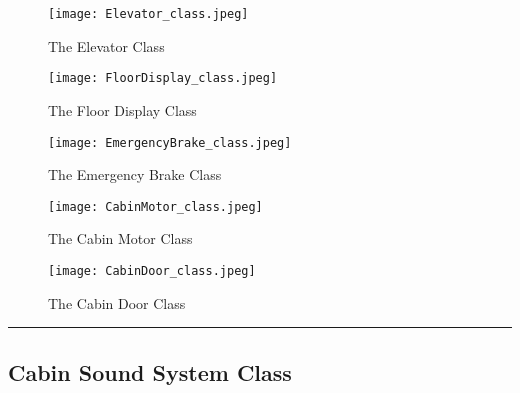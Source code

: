 \documentclass[12pt]{article}
\begin{document}
    \begin{figure}[H]
  		\centerline{\texttt{[image: Elevator\_class.jpeg]}}
  		\caption{The Elevator Class}
  		\label{fig:Elevator_class}
	\end{figure}
    \begin{figure}[H]
  		\centerline{\texttt{[image: FloorDisplay\_class.jpeg]}}
  		\caption{The Floor Display Class}
  		\label{fig:FloorDisplay_class}
	\end{figure}
    \begin{figure}[H]
  		\centerline{\texttt{[image: EmergencyBrake\_class.jpeg]}}
  		\caption{The Emergency Brake Class}
  		\label{fig:EmergencyBrake_class}
	\end{figure}
    \begin{figure}[H]
  		\centerline{\texttt{[image: CabinMotor\_class.jpeg]}}
  		\caption{The Cabin Motor Class}
  		\label{fig:CabinMotor_class}
	\end{figure}
	\begin{figure}[H]
  		\centerline{\texttt{[image: CabinDoor\_class.jpeg]}}
  		\caption{The Cabin Door Class}
  		\label{fig:CabinDoor_class}
	\end{figure}
	\par\noindent\rule{\textwidth}{0.4pt}

	\subsection*{Cabin Sound System Class}
\end{document}
